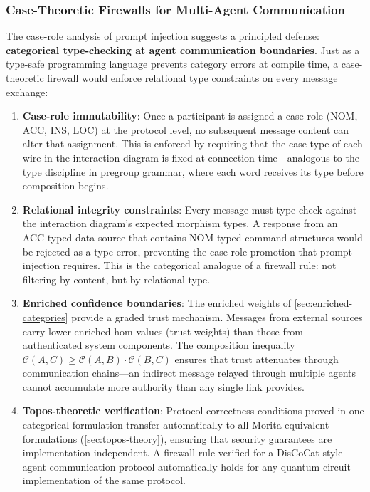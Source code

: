 \documentclass[
]{article}
\numberwithin{equation}{section}
\begin{document}
\subsubsection{Case-Theoretic Firewalls for Multi-Agent
Communication}\label{case-theoretic-firewalls-for-multi-agent-communication}

The case-role analysis of prompt injection suggests a principled
defense: \textbf{categorical type-checking at agent communication
boundaries}. Just as a type-safe programming language prevents category
errors at compile time, a case-theoretic firewall would enforce
relational type constraints on every message exchange:

\begin{enumerate}
\def\labelenumi{\arabic{enumi}.}
\item
  \textbf{Case-role immutability}: Once a participant is assigned a case
  role (NOM, ACC, INS, LOC) at the protocol level, no subsequent message
  content can alter that assignment. This is enforced by requiring that
  the case-type of each wire in the interaction diagram is fixed at
  connection time---analogous to the type discipline in pregroup
  grammar, where each word receives its type before composition begins.
\item
  \textbf{Relational integrity constraints}: Every message must
  type-check against the interaction diagram's expected morphism types.
  A response from an ACC-typed data source that contains NOM-typed
  command structures would be rejected as a type error, preventing the
  case-role promotion that prompt injection requires. This is the
  categorical analogue of a firewall rule: not filtering by content, but
  by relational type.
\item
  \textbf{Enriched confidence boundaries}: The enriched weights of
  \autoref{sec:enriched-categories} provide a graded trust mechanism.
  Messages from external sources carry lower enriched hom-values (trust
  weights) than those from authenticated system components. The
  composition inequality
  \(\mathcal{C}(A,C) \geq \mathcal{C}(A,B) \cdot \mathcal{C}(B,C)\)
  ensures that trust attenuates through communication chains---an
  indirect message relayed through multiple agents cannot accumulate
  more authority than any single link provides.
\item
  \textbf{Topos-theoretic verification}: Protocol correctness conditions
  proved in one categorical formulation transfer automatically to all
  Morita-equivalent formulations (\autoref{sec:topos-theory}), ensuring
  that security guarantees are implementation-independent. A firewall
  rule verified for a DisCoCat-style agent communication protocol
  automatically holds for any quantum circuit implementation of the same
  protocol.
\end{enumerate}
\end{document}
